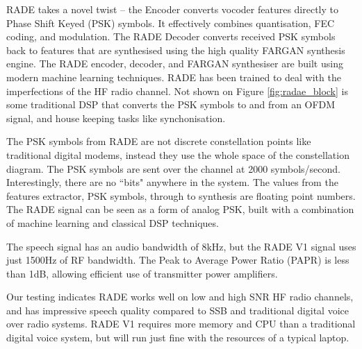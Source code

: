 \documentclass{article}
\begin{document}
RADE takes a novel twist – the Encoder converts vocoder features directly to Phase Shift Keyed (PSK) symbols. It effectively combines quantisation, FEC coding, and modulation.  The RADE Decoder converts received PSK symbols back to features that are synthesised using the high quality FARGAN synthesis engine. The RADE encoder, decoder, and FARGAN synthesiser are built using modern machine learning techniques.  RADE has been trained to deal with the imperfections of the HF radio channel. Not shown on Figure \ref{fig:radae_block} is some traditional DSP that converts the PSK symbols to and from an OFDM signal, and house keeping tasks like synchonisation.

The PSK symbols from RADE are not discrete constellation points like traditional digital modems, instead they use the whole space of the constellation diagram.  The PSK symbols are sent over the channel at 2000 symbols/second.  Interestingly, there are no ``bits" anywhere in the system.  The values from the features extractor, PSK symbols, through to synthesis are floating point numbers. The RADE signal can be seen as a form of analog PSK, built with a combination of machine learning and classical DSP techniques.

The speech signal has an audio bandwidth of 8kHz, but the RADE V1 signal uses just 1500Hz of RF bandwidth. The Peak to Average Power Ratio (PAPR) is less than 1dB, allowing efficient use of transmitter power amplifiers.

Our testing indicates RADE works well on low and high SNR HF radio channels, and has impressive speech quality compared to SSB and traditional digital voice over radio systems. RADE V1 requires more memory and CPU than a traditional digital voice system, but will run just fine with the resources of a typical laptop.
\end{document}
